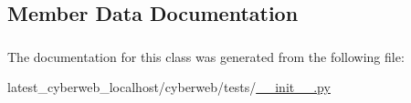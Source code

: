 \subsection{\-Member \-Data \-Documentation}
\hypertarget{classcyberweb_1_1tests_1_1_test_controller_a96e53400ee3e045aeb0930b1bb92ccda}{
\subsubsection[{app}]{}}\label{classcyberweb_1_1tests_1_1_test_controller_a96e53400ee3e045aeb0930b1bb92ccda}


\-The documentation for this class was generated from the following file\-:\begin{DoxyCompactItemize}
\item 
latest\-\_\-cyberweb\-\_\-localhost/cyberweb/tests/\hyperlink{tests_2____init_____8py}{\-\_\-\-\_\-init\-\_\-\-\_\-.\-py}\end{DoxyCompactItemize}
